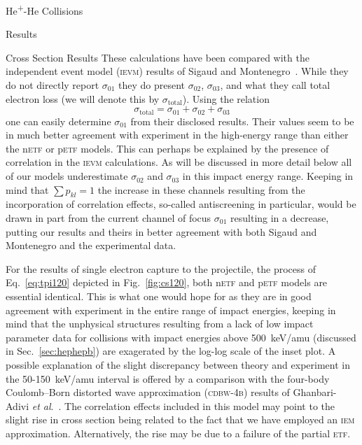 \documentclass[letterpaper, 11 pt]{report}
\begin{document}
\begin{chapter}{\texorpdfstring{He\textsuperscript{+}}{He+}-He Collisions \label{chap:hephe}}
\begin{section}{Results \label{sec:hephe-disc}}
\begin{subsection}{Cross Section Results \label{sec:hephe-res}}
         These calculations have been compared with the independent event model (\textsc{ievm}) results
         of Sigaud and Montenegro~\cite{SM-03}. While they do not directly report $\sigma_{01}$ they do
         present $\sigma_{02}$, $\sigma_{03}$, and what they call total electron loss (we will denote
         this by $\sigma_\mathrm{total}$). Using the relation
         \begin{equation} \label{eq:total}
            \sigma_\mathrm{total} = \sigma_{01} + \sigma_{02} + \sigma_{03}
         \end{equation}
         one can easily determine $\sigma_{01}$ from their disclosed results. Their values seem to be in
         much better agreement with experiment in the high-energy range than either the n\textsc{etf} or
         p\textsc{etf} models. This can perhaps be explained by the presence of correlation in the
         \textsc{ievm} calculations. As will be discussed in more detail below all of our models
         underestimate $\sigma_{02}$ and $\sigma_{03}$ in this impact energy range. Keeping in mind that
         $\sum p_{kl} = 1$ the increase in these channels resulting from the incorporation of
         correlation effects, so-called antiscreening in particular, would be drawn in part from the
         current channel of focus $\sigma_{01}$ resulting in a decrease, putting our results and theirs
         in better agreement with both Sigaud and Montenegro and the experimental data.

         For the results of single electron capture to the projectile, the process of
         Eq.~\eqref{eq:tpi120} depicted in Fig.~\ref{fig:cs120}, both n\textsc{etf} and p\textsc{etf}
         models are essential identical. This is what one would hope for as they are in good agreement
         with experiment in the entire range of impact energies, keeping in mind that the unphysical
         structures resulting from a lack of low impact parameter data for collisions with impact
         energies above 500~keV/amu (discussed in Sec.~\ref{sec:hephepb}) are exagerated by the log-log
         scale of the inset plot. A possible explanation of the slight discrepancy between theory and
         experiment in the 50-150~keV/amu interval is offered by a comparison with the four-body
         Coulomb–Born distorted wave approximation (\textsc{cdbw-4b}) results of Ghanbari-Adivi
         \textit{et al}.~\cite{GAG15}. The correlation effects included in this model may point to the
         slight rise in cross section being related to the fact that we have employed an \textsc{iem}
         approximation. Alternatively, the rise may be due to a failure of the partial \textsc{etf}.


\end{subsection}
\end{section}
\end{chapter}
\end{document}
